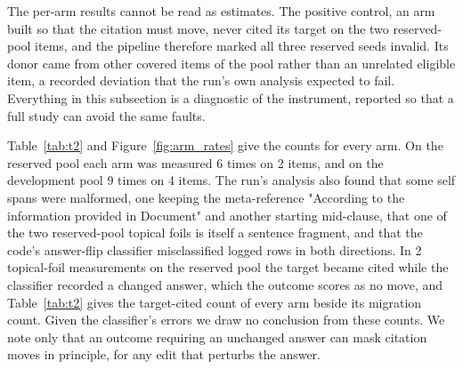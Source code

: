 \documentclass[11pt]{article}
\begin{document}
The per-arm results cannot be read as estimates. The positive control, an arm built so that the citation must move, never cited its target on the two reserved-pool items, and the pipeline therefore marked all three reserved seeds invalid. Its donor came from other covered items of the pool rather than an unrelated eligible item, a recorded deviation that the run's own analysis expected to fail. Everything in this subsection is a diagnostic of the instrument, reported so that a full study can avoid the same faults.

Table~\ref{tab:t2} and Figure~\ref{fig:arm_rates} give the counts for every arm. On the reserved pool each arm was measured 6 times on 2 items, and on the development pool 9 times on 4 items. The run's analysis also found that some self spans were malformed, one keeping the meta-reference "According to the information provided in Document" and another starting mid-clause, that one of the two reserved-pool topical foils is itself a sentence fragment, and that the code's answer-flip classifier misclassified logged rows in both directions. In 2 topical-foil measurements on the reserved pool the target became cited while the classifier recorded a changed answer, which the outcome scores as no move, and Table~\ref{tab:t2} gives the target-cited count of every arm beside its migration count. Given the classifier's errors we draw no conclusion from these counts. We note only that an outcome requiring an unchanged answer can mask citation moves in principle, for any edit that perturbs the answer.
\end{document}
